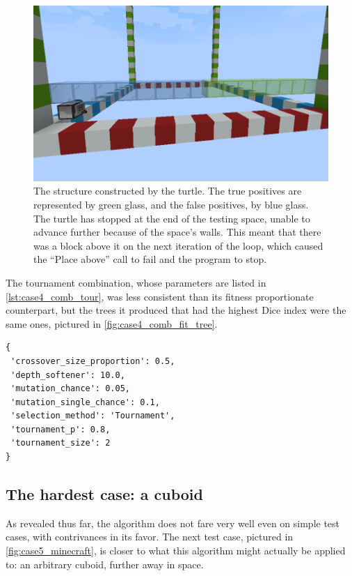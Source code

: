 \documentclass{report}
\newenvironment{code}{\captionsetup{type=listing}}{}
\begin{document}
\begin{figure}[H]
    \centering
    \includegraphics[scale=0.5]{case4_fit_minecraft}
    \caption{The structure constructed by the turtle. The true positives are represented by green glass, and the false positives, by blue glass. The turtle has stopped at the end of the testing space, unable to advance further because of the space's walls. This meant that there was a block above it on the next iteration of the loop, which caused the ``Place above'' call to fail and the program to stop.}
    \label{fig:case4_comb_fit_minecraft}
\end{figure}

The tournament combination, whose parameters are listed in \autoref{lst:case4_comb_tour}, was less consistent than its fitness proportionate counterpart, but the trees it produced that had the highest Dice index were the same ones, pictured in \autoref{fig:case4_comb_fit_tree}.

\begin{code}
    \begin{verbatim}
{
 'crossover_size_proportion': 0.5,
 'depth_softener': 10.0,
 'mutation_chance': 0.05,
 'mutation_single_chance': 0.1,
 'selection_method': 'Tournament',
 'tournament_p': 0.8,
 'tournament_size': 2
}
    \end{verbatim}
    \caption{A set of parameters that lead to an average index of $0.645$ and an average depth of $2.366$.}
    \label{lst:case4_comb_tour}
\end{code}

\subsection{The hardest case: a cuboid}

As revealed thus far, the algorithm does not fare very well even on simple test cases, with contrivances in its favor. The next test case, pictured in \autoref{fig:case5_minecraft}, is closer to what this algorithm might actually be applied to: an arbitrary cuboid, further away in space.
\end{document}

